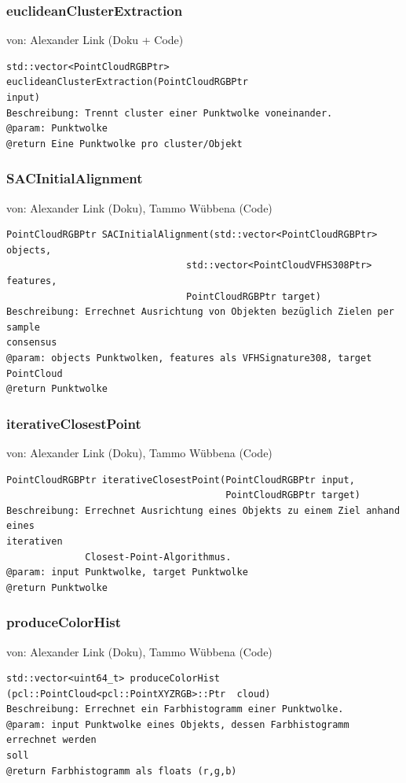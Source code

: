 \documentclass{suturo}
\makeatletter
\newcommand{\chapterauthor}[1]{%
  {\parindent0pt\vspace*{-27pt}%
  \linespread{0}\small\begin{flushright}von: #1\end{flushright}%
  \par\nobreak\vspace*{0pt}}
  \@afterheading%
}
\makeatother
\begin{document}
\subsubsection{euclideanClusterExtraction}
\chapterauthor{Alexander Link (Doku + Code)}
\begin{verbatim}
std::vector<PointCloudRGBPtr> euclideanClusterExtraction(PointCloudRGBPtr
input)
Beschreibung: Trennt cluster einer Punktwolke voneinander.
@param: Punktwolke
@return Eine Punktwolke pro cluster/Objekt
\end{verbatim}\label{func:euclideanClusterExtraction}

\subsubsection{SACInitialAlignment}
\chapterauthor{Alexander Link (Doku), Tammo Wübbena (Code)}
\begin{verbatim}
PointCloudRGBPtr SACInitialAlignment(std::vector<PointCloudRGBPtr> objects,
                                std::vector<PointCloudVFHS308Ptr> features,
                                PointCloudRGBPtr target)
Beschreibung: Errechnet Ausrichtung von Objekten bezüglich Zielen per sample
consensus
@param: objects Punktwolken, features als VFHSignature308, target PointCloud
@return Punktwolke
\end{verbatim}\label{func:sacinitialalignment}

\subsubsection{iterativeClosestPoint}
\chapterauthor{Alexander Link (Doku), Tammo Wübbena (Code)}
\begin{verbatim}
PointCloudRGBPtr iterativeClosestPoint(PointCloudRGBPtr input,
                                       PointCloudRGBPtr target)
Beschreibung: Errechnet Ausrichtung eines Objekts zu einem Ziel anhand eines
iterativen 
			  Closest-Point-Algorithmus.
@param: input Punktwolke, target Punktwolke
@return Punktwolke
\end{verbatim}\label{func:iterativeClosestPoint}

\subsubsection{produceColorHist}
\chapterauthor{Alexander Link (Doku), Tammo Wübbena (Code)}
\begin{verbatim}
std::vector<uint64_t> produceColorHist
(pcl::PointCloud<pcl::PointXYZRGB>::Ptr  cloud)
Beschreibung: Errechnet ein Farbhistogramm einer Punktwolke.
@param: input Punktwolke eines Objekts, dessen Farbhistogramm errechnet werden
soll
@return Farbhistogramm als floats (r,g,b)
\end{verbatim}\label{func:produceColorHist}
\end{document}
